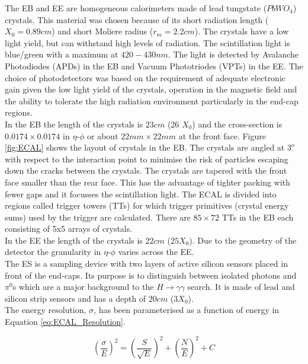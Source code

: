 The EB and EE are homogeneous calorimeters made of lead tungstate ($PbWO_{4}$)
crystals. This material was chosen because of its short radiation length ($X_{0}
= 0.89\unit{cm}$) and short Moliere radius ($r_{m} = 2.2\unit{cm}$). The 
crystals have a low light yield, but can withstand high levels of radiation. The 
scintillation light is blue/green with a maximum at $420-430\unit{nm}$. The 
light is detected by Avalanche Photodiodes (APDs) in the EB and Vacuum 
Phototriodes (VPTs) in the EE. The choice of photodetectors was based on the 
requirement of adequate electronic gain given the low light yield of the 
crystals, operation in the magnetic field and the ability to tolerate the high 
radiation environment particularly in the end-cap regions. \\

In the EB the length of the crystals is $23\unit{cm}$ (26 $X_{0}$) and the 
cross-section is $0.0174\times0.0174$ in $\eta$-$\phi$ or about 
$22\unit{mm}\times22\unit{mm}$ at the front face. Figure \ref{fig:ECAL} shows 
the layout of crystals in the EB. The crystals are angled at $3^{o}$ with 
respect to the interaction point to minimise the risk of particles escaping 
down the cracks between the crystals. The crystals are tapered with the front 
face smaller than the rear face. This has the advantage of tighter packing with
fewer gaps and it focusses the scintillation light. The ECAL is divided into 
regions called trigger towers (TTs) for which trigger primitives (crystal energy 
sums) used by the trigger are calculated. There are $85\times72$ TTs in the EB 
each consisting of 5x5 arrays of crystals. \\

In the EE the length of the crystals is $22\unit{cm}$ ($25X_{0}$). Due to the 
geometry of the detector the granularity in $\eta$-$\phi$ varies across the EE. 
\\

The ES is a sampling device with two layers of active silicon sensors placed in 
front of the end-caps. Its purpose is to distinguish between isolated photons 
and $\pi^{0}$s which are a major background to the $H\rightarrow \gamma\gamma$ 
search. It is made of lead and silicon strip sensors and has a depth of 
$20\unit{cm}$ ($3X_{0}$). \\

The energy resolution, $\sigma$, has been parameterised as a function of energy 
in Equation \ref{eq:ECAL_Resolution}. 

\begin{equation}
\left( \frac{\sigma}{E} \right)^{2} = \left( \frac{S}{\sqrt{E}} \right)^{2} +
\left( \frac{N}{E} \right)^{2} + C
\label{eq:ECAL_Resolution}
\end{equation}

